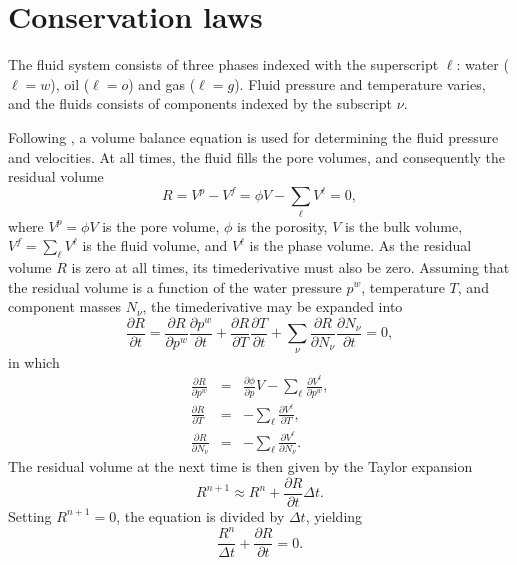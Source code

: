 \chapter{Conservation laws}

\minitoc

The fluid system consists of three phases indexed with the superscript
$\ell$: water ($\ell=w$), oil ($\ell=o$) and gas ($\ell=g$). Fluid
pressure and temperature varies, and the fluids consists of components
indexed by the subscript $\nu$.



Following \cite{watts1986}, a volume balance equation is used for
determining the fluid pressure and velocities. At all times, the fluid
fills the pore volumes, and consequently the residual volume
\begin{equation}
  R = V^p - V^f = \phi V - \sum_\ell V^\ell = 0,
\end{equation}
where $V^p=\phi V$ is the pore volume, $\phi$ is the porosity, $V$ is
the bulk volume, $V^f=\sum_\ell V^\ell$ is the fluid volume, and
$V^\ell$ is the phase volume. As the residual volume $R$ is zero at
all times, its timederivative must also be zero.  Assuming that the
residual volume is a function of the water pressure $p^w$, temperature
$T$, and component masses $N_\nu$, the timederivative may be expanded
into
\begin{equation}
  \frac{\partial R}{\partial t} =
  \frac{\partial R}{\partial p^w} \frac{\partial p^w}{\partial t} +
  \frac{\partial R}{\partial T} \frac{\partial T}{\partial t} +
  \sum_\nu \frac{\partial R}{\partial N_\nu}
  \frac{\partial N_\nu}{\partial t} = 0,
\end{equation}
in which
\begin{eqnarray}
  \frac{\partial R}{\partial p^w} & = &
  \frac{\partial\phi}{\partial p} V
  -\sum_\ell \frac{\partial V^\ell}{\partial p^w}, \\
  \frac{\partial R}{\partial T} & = &
  -\sum_\ell \frac{\partial V^\ell}{\partial T}, \\
  \frac{\partial R}{\partial N_\nu} & = &
  -\sum_\ell \frac{\partial V^\ell}{\partial N_\nu}.
\end{eqnarray}
The residual volume at the next time is then given by the Taylor
expansion
\begin{equation}
  R^{n+1} \approx R^n + \frac{\partial R}{\partial t} \Delta t.
\end{equation}
Setting $R^{n+1}=0$, the equation is divided by $\Delta t$, yielding
\begin{equation}
  \frac{R^n}{\Delta t} + \frac{\partial R}{\partial t} = 0.
\end{equation}

